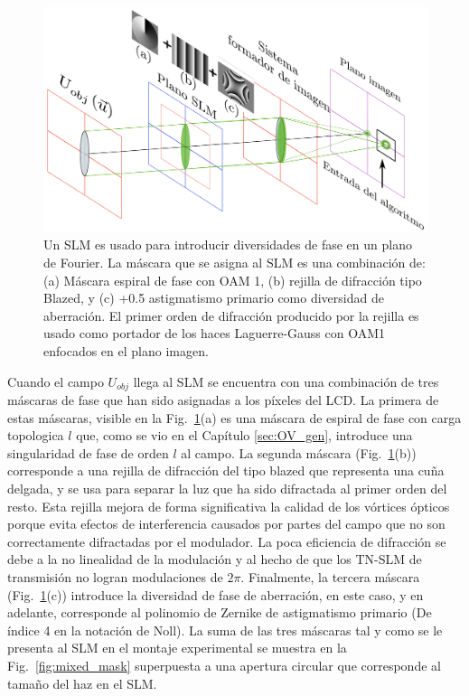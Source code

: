 \begin{figure}[h!]
\centering
\includegraphics[scale=.5]{PhaseDiversitySetup_esp.pdf}
\caption[Diagrama del sistema óptico para PD con iluminación coherente.]{Un SLM es usado para introducir diversidades de fase en un
  plano de Fourier. La máscara que se asigna al SLM es una combinación de:
  (a) Máscara espiral de fase con OAM 1, (b) rejilla de difracción
  tipo Blazed, y (c) +0.5 astigmatismo primario como diversidad de
  aberración. El primer orden de difracción producido por la rejilla
  es usado como portador de los haces Laguerre-Gauss con OAM1
  enfocados en el plano imagen.} 
\label{fig:set-up}
\end{figure}

Cuando el campo $U_{obj}$ llega al SLM se encuentra con una combinación de tres
máscaras de fase que han sido asignadas a los píxeles del LCD. La
primera de estas máscaras, visible en la Fig.~\ref{fig:set-up}(a)  es una máscara de espiral de fase con carga
topologica $l$ que, como se vio en el Capítulo \ref{sec:OV_gen}, introduce una
singularidad de fase de orden $l$ al campo. La segunda máscara
(Fig.~\ref{fig:set-up}(b)) corresponde a una rejilla de difracción del tipo
blazed que representa una cuña delgada, y se usa para separar la luz
que ha sido difractada al primer orden del resto. 
Esta rejilla mejora de forma significativa la calidad
de los vórtices ópticos porque evita efectos de interferencia causados
por partes del campo que no son correctamente difractadas por el
modulador. La poca eficiencia de difracción se debe a la no linealidad
de la modulación y al hecho de que los TN-SLM de transmisión no logran
modulaciones de $2\pi$.  Finalmente, la tercera máscara
(Fig.~\ref{fig:set-up}(c)) introduce la diversidad de fase de
aberración, en este caso, y en adelante,  corresponde al polinomio de
Zernike de astigmatismo primario (De índice 4 en la notación de
Noll). La suma de las tres máscaras tal y como se le presenta al SLM
en el montaje experimental se muestra en la Fig.~\ref{fig:mixed_mask} superpuesta a una
apertura circular que corresponde al tamaño del haz en el SLM.   

